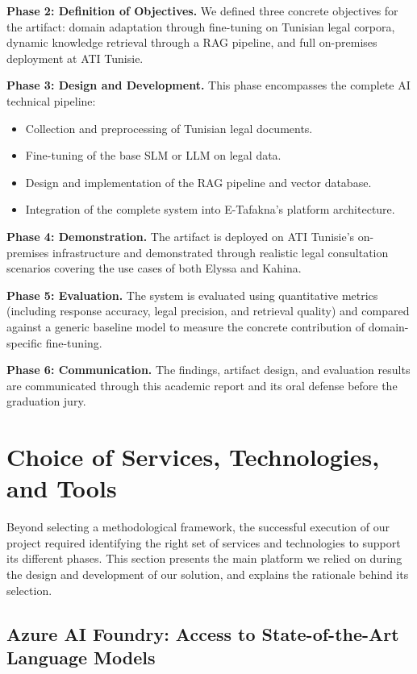 \textbf{Phase 2: Definition of Objectives.}
We defined three concrete objectives for the artifact: domain adaptation through 
fine-tuning on Tunisian legal corpora, dynamic knowledge retrieval through a 
\ac{RAG} pipeline, and full on-premises deployment at \ac{ATI} Tunisie.

\textbf{Phase 3: Design and Development.}
This phase encompasses the complete \ac{AI} technical pipeline:
\begin{itemize}
    \item Collection and preprocessing of Tunisian legal documents.
    \item Fine-tuning of the base \ac{SLM} or \ac{LLM} on legal data.
    \item Design and implementation of the \ac{RAG} pipeline and vector database.
    \item Integration of the complete system into E-Tafakna's platform architecture.
\end{itemize}

\textbf{Phase 4: Demonstration.}
The artifact is deployed on \ac{ATI} Tunisie's on-premises infrastructure and 
demonstrated through realistic legal consultation scenarios covering the use cases 
of both Elyssa and Kahina.

\textbf{Phase 5: Evaluation.}
The system is evaluated using quantitative metrics (including response accuracy, 
legal precision, and retrieval quality) and compared against a generic baseline 
model to measure the concrete contribution of domain-specific fine-tuning.

\textbf{Phase 6: Communication.}
The findings, artifact design, and evaluation results are communicated through this 
academic report and its oral defense before the graduation jury.

\section{Choice of Services, Technologies, and Tools}
\label{sec:tools-choice}

Beyond selecting a methodological framework, the successful execution of our project 
required identifying the right set of services and technologies to support its different 
phases. This section presents the main platform we relied on during the design and 
development of our solution, and explains the rationale behind its selection.

\subsection{Azure AI Foundry: Access to State-of-the-Art Language Models}

